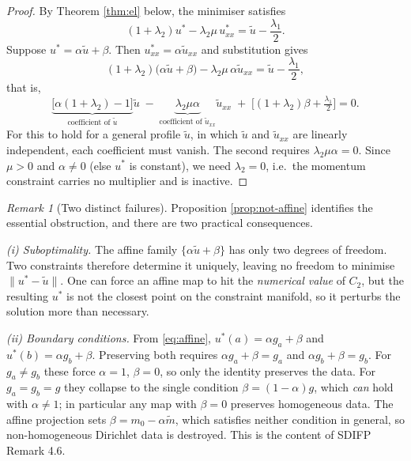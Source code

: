 \documentclass[11pt,a4paper]{article}
\theoremstyle{remark}
\newtheorem{remark}{Remark}
\newcommand{\ut}{\tilde{u}}
\newcommand{\us}{u^{*}}
\begin{document}
\begin{proof}
By Theorem \ref{thm:el} below, the minimiser satisfies
\begin{equation}
(1+\lambda_2)\us - \lambda_2\mu\,\us_{xx} = \ut - \frac{\lambda_1}{2}.
\end{equation}
Suppose $\us = \alpha\ut+\beta$. Then $\us_{xx} = \alpha\ut_{xx}$ and substitution gives
\begin{equation}
(1+\lambda_2)\big(\alpha\ut+\beta\big) - \lambda_2\mu\,\alpha\ut_{xx}
= \ut - \frac{\lambda_1}{2},
\end{equation}
that is,
\begin{equation}
\underbrace{\Big[\alpha(1+\lambda_2)-1\Big]}_{\text{coefficient of }\ut}\ut
\;-\;\underbrace{\lambda_2\mu\alpha}_{\text{coefficient of }\ut_{xx}}\ut_{xx}
\;+\;\Big[(1+\lambda_2)\beta + \tfrac{\lambda_1}{2}\Big] = 0 .
\end{equation}
For this to hold for a general profile $\ut$, in which $\ut$ and $\ut_{xx}$ are
linearly independent, each coefficient must vanish. The second requires
$\lambda_2\mu\alpha = 0$. Since $\mu>0$ and $\alpha\neq 0$ (else $\us$ is
constant), we need $\lambda_2 = 0$, i.e.\ the momentum constraint carries no
multiplier and is inactive.
\end{proof}

\begin{remark}[Two distinct failures]
Proposition \ref{prop:not-affine} identifies the essential obstruction, and there
are two practical consequences.

\emph{(i) Suboptimality.} The affine family $\{\alpha\ut+\beta\}$ has only two
degrees of freedom. Two constraints therefore determine it uniquely, leaving no
freedom to minimise $\|\us-\ut\|$. One can force an affine map to hit the
\emph{numerical value} of $C_2$, but the resulting $\us$ is not the closest point
on the constraint manifold, so it perturbs the solution more than necessary.

\emph{(ii) Boundary conditions.} From \eqref{eq:affine},
$\us(a) = \alpha g_a + \beta$ and $\us(b) = \alpha g_b + \beta$. Preserving both
requires $\alpha g_a + \beta = g_a$ and $\alpha g_b + \beta = g_b$. For
$g_a \neq g_b$ these force $\alpha = 1$, $\beta = 0$, so only the identity
preserves the data. For $g_a = g_b = g$ they collapse to the single condition
$\beta = (1-\alpha)g$, which \emph{can} hold with $\alpha \neq 1$; in
particular any map with $\beta = 0$ preserves homogeneous data. The affine
projection sets $\beta = m_0 - \alpha\tilde m$, which satisfies neither
condition in general, so non-homogeneous Dirichlet data is destroyed. This is
the content of SDIFP Remark 4.6.
\end{remark}
\end{document}
